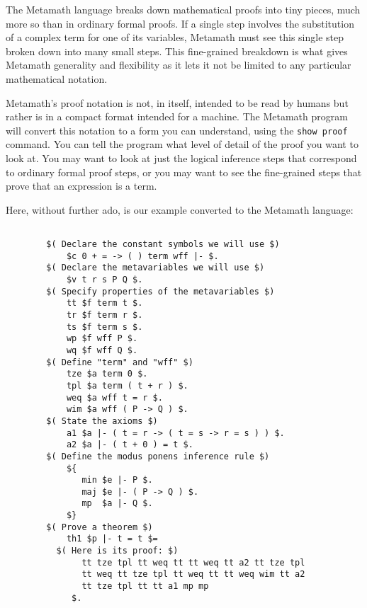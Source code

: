 The Metamath language breaks down mathematical proofs into tiny pieces, much
more so than in ordinary formal proofs.  If a single
step involves the
substitution of a
complex term for one of its variables, Metamath must see this single step
broken down into many small steps.  This fine-grained breakdown is what gives
Metamath generality and flexibility as it lets it not be limited to any
particular mathematical notation.

Metamath's proof notation is not, in itself, intended to be read by humans but
rather is in a compact format intended for a machine.  The Metamath program
will convert this notation to a form you can understand, using the \texttt{show
proof} command.  You can tell the program what
level of detail of the proof you want to look at.  You may want to look at
just the logical inference steps that correspond
to ordinary formal proof steps,
or you may want to see the fine-grained steps that prove that an expression is
a term.

Here, without further ado, is our example converted to the
Metamath language:\label{demo0}

\begin{verbatim}

        $( Declare the constant symbols we will use $)
            $c 0 + = -> ( ) term wff |- $.
        $( Declare the metavariables we will use $)
            $v t r s P Q $.
        $( Specify properties of the metavariables $)
            tt $f term t $.
            tr $f term r $.
            ts $f term s $.
            wp $f wff P $.
            wq $f wff Q $.
        $( Define "term" and "wff" $)
            tze $a term 0 $.
            tpl $a term ( t + r ) $.
            weq $a wff t = r $.
            wim $a wff ( P -> Q ) $.
        $( State the axioms $)
            a1 $a |- ( t = r -> ( t = s -> r = s ) ) $.
            a2 $a |- ( t + 0 ) = t $.
        $( Define the modus ponens inference rule $)
            ${
               min $e |- P $.
               maj $e |- ( P -> Q ) $.
               mp  $a |- Q $.
            $}
        $( Prove a theorem $)
            th1 $p |- t = t $=
          $( Here is its proof: $)
               tt tze tpl tt weq tt tt weq tt a2 tt tze tpl
               tt weq tt tze tpl tt weq tt tt weq wim tt a2
               tt tze tpl tt tt a1 mp mp
             $.
\end{verbatim}

